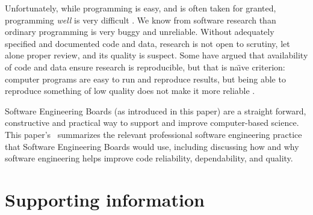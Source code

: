 Unfortunately, while programming is easy, and is often taken for granted, programming \emph{well\/} is very difficult \cite{fixit}. We know from software research than ordinary programming is very buggy and unreliable. Without adequately specified and documented code and data, research is not open to scrutiny, let alone proper review, and its quality is suspect. Some have argued that availability of code and data ensure research is reproducible, but that is na\"\i ve criterion:  computer programs are easy to run and reproduce results, but being able to reproduce something of low quality does not make it more reliable \cite{reproducibility,relit,popper}. 

Software Engineering Boards (as introduced in this paper) are a straight forward, constructive and practical way to support and improve computer-based science. This paper's \supplement\ summarizes the relevant professional software engineering practice that Software Engineering Boards would use, including discussing how and why software engineering helps improve code reliability, dependability, and quality.

\section*{Supporting information}
\newcount\csrefcount {}
\def\csref{\global\advance\csrefcount by 1}
\long{}
\long{}
\long{}
\long{}
\long{}
\long{}


